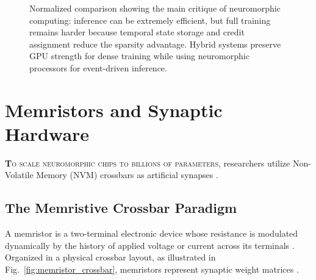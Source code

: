 \documentclass[11pt]{article}
\newcommand{\sectionlead}[2]{\noindent\lettrine[lines=2,lhang=0.08,nindent=0.12em]{\textcolor{IEEEblue}{\bfseries #1}}{\hspace{0.03em}#2}}
\begin{document}
\begin{figure}[htbp]
    \centering
    \caption{Normalized comparison showing the main critique of neuromorphic computing: inference can be extremely efficient, but full training remains harder because temporal state storage and credit assignment reduce the sparsity advantage. Hybrid systems preserve GPU strength for dense training while using neuromorphic processors for event-driven inference.}
    \label{fig:training_energy}
\end{figure}

\section{Memristors and Synaptic Hardware}
\sectionlead{T}{o scale neuromorphic chips to billions of parameters}, researchers utilize Non-Volatile Memory (NVM) crossbars as artificial synapses \cite{schuman2017survey,mead1990neuromorphic}.

\subsection{The Memristive Crossbar Paradigm}
A memristor is a two-terminal electronic device whose resistance is modulated dynamically by the history of applied voltage or current across its terminals \cite{schuman2017survey}. Organized in a physical crossbar layout, as illustrated in Fig.~\ref{fig:memristor_crossbar}, memristors represent synaptic weight matrices \cite{schuman2017survey}.
\end{document}
